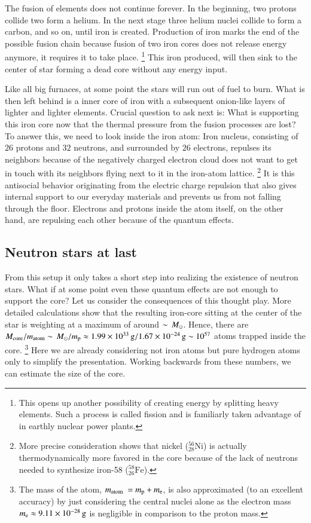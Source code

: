 The fusion of elements does not continue forever.
In the beginning, two protons collide two form a helium.
In the next stage three helium nuclei collide to form a carbon, and so on, until iron is created.
Production of iron marks the end of the possible fusion chain because fusion of two iron cores does not release energy anymore, it requires it to take place.%
\footnote{This opens up another possibility of creating energy by splitting heavy elements. Such a process is called fission and is familiarly taken advantage of in earthly nuclear power plants.}
This iron produced, will then sink to the center of star forming a dead core without any energy input.

Like all big furnaces, at some point the stars will run out of fuel to burn.
What is then left behind is a inner core of iron with a subsequent onion-like layers of lighter and lighter elements.
Crucial question to ask next is: 
What is supporting this iron core now that the thermal pressure from the fusion processes are lost?
To answer this, we need to look inside the iron atom:
Iron nucleus, consisting of $26$ protons and $32$ neutrons, and surrounded by $26$ electrons, repulses its neighbors because of the negatively charged electron cloud does not want to get in touch with its neighbors flying next to it in the iron-atom lattice.
\footnote{More precise consideration shows that nickel ($^{56}_{28}\mathrm{Ni}$) is actually thermodynamically more favored in the core because of the lack of neutrons needed to synthesize iron-58 ($^{58}_{26}\mathrm{Fe}$).
}
It is this antisocial behavior originating from the electric charge repulsion that also gives internal support to our everyday materials and prevents us from not falling through the floor.
Electrons and protons inside the atom itself, on the other hand, are repulsing each other because of the quantum effects.

\subsection{Neutron stars at last}
From this setup it only takes a short step into realizing the existence of neutron stars.
What if at some point even these quantum effects are not enough to support the core?
Let us consider the consequences of this thought play.
More detailed calculations show that the resulting iron-core sitting at the center of the star is weighting at a maximum of around $\sim \, M_{\odot}$.
Hence, there are $M_{\mathrm{core}} / m_{\mathrm{atom}} \sim \, M_{\odot} / m_{\mathrm{p}} \approx 1.99 \times 10^{33} \, \mathrm{g} / 1.67 \times 10^{-24} \, \mathrm{g} \sim 10^{57}$ atoms trapped inside the core.
\footnote{
    The mass of the atom, $m_{\mathrm{atom}} = \mproton + \me$, is also approximated (to an excellent accuracy) by just considering the central nuclei alone as the electron mass $m_{\mathrm{e}} \approx 9.11 \times 10^{-28} \, \mathrm{g}$ is negligible in comparison to the proton mass.
}
Here we are already considering not iron atoms but pure hydrogen atoms only to simplify the presentation.
Working backwards from these numbers, we can estimate the size of the core.



